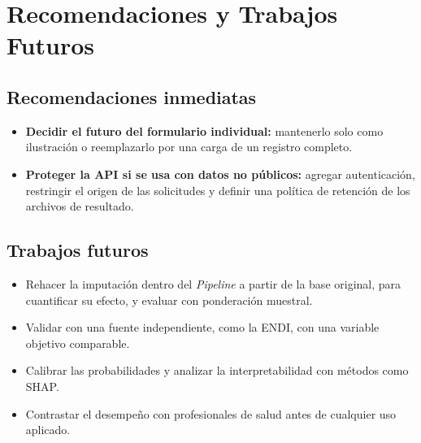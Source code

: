 

\section{Recomendaciones y Trabajos Futuros}
\subsection{Recomendaciones inmediatas}
\begin{itemize}
  \item \textbf{Decidir el futuro del formulario individual:} mantenerlo solo como ilustración o reemplazarlo por una carga de un registro completo.
  \item \textbf{Proteger la API si se usa con datos no públicos:} agregar autenticación, restringir el origen de las solicitudes y definir una política de retención de los archivos de resultado.
\end{itemize}

\subsection{Trabajos futuros}
\begin{itemize}
  \item Rehacer la imputación dentro del \textit{Pipeline} a partir de la base original, para cuantificar su efecto, y evaluar con ponderación muestral.
  \item Validar con una fuente independiente, como la ENDI, con una variable objetivo comparable.
  \item Calibrar las probabilidades y analizar la interpretabilidad con métodos como SHAP.
  \item Contrastar el desempeño con profesionales de salud antes de cualquier uso aplicado.
\end{itemize}

